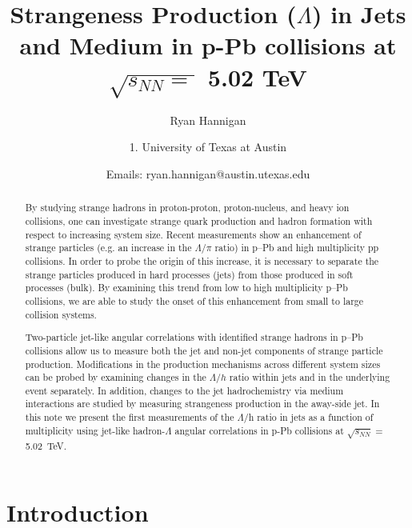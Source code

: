 \documentclass[ALICE,manyauthors]{ALICE_analysis_notes}
\begin{document}
%
%
%
\begin{titlepage}
%
\PHdate{\today}
%
\title{Strangeness Production ($\Lambda$) in Jets and Medium in p-Pb collisions at $\sqrt{s_{NN} = }$ 5.02 TeV}
%
\author{Ryan Hannigan}
\author{
1. University of Texas at Austin\\
}
\author{Emails: ryan.hannigan@austin.utexas.edu}
%
%
\begin{abstract}
By studying strange hadrons in proton-proton, proton-nucleus, and heavy ion collisions, one can investigate strange quark production and hadron formation with respect to increasing system size. Recent measurements show an enhancement of strange particles (e.g. an increase in the $\Lambda$/$\pi$ ratio) in p--Pb and high multiplicity pp collisions. In order to probe the origin of this increase, it is necessary to separate the strange particles produced in hard processes (jets) from those produced in soft processes (bulk). By examining this trend from low to high multiplicity p--Pb collisions, we are able to study the onset of this enhancement from small to large collision systems.

Two-particle jet-like angular correlations with identified strange hadrons in p--Pb collisions allow us to measure both the jet and non-jet components of strange particle production. Modifications in the production mechanisms across different system sizes can be probed by examining changes in the $\Lambda/h$ ratio within jets and in the underlying event separately. In addition, changes to the jet hadrochemistry via medium interactions are studied by measuring strangeness production in the away-side jet. In this note we present the first measurements of the $\Lambda$/h ratio in jets as a function of multiplicity using jet-like hadron-$\Lambda$ angular correlations in p-Pb collisions at $\sqrt{s_{NN}} =$ \SI{5.02}{TeV}.
\end{abstract}
\end{titlepage}
%
\tableofcontents
\clearpage

\section{Introduction}
\end{document}
